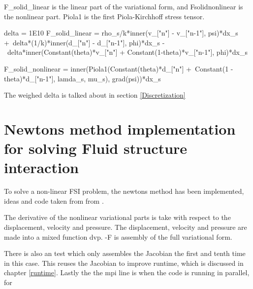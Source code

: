 F\_solid\_linear is the linear part of the variational form, and Fsolidnonlinear is the nonlinear part.
Piola1 is the first Piola-Kirchhoff stress tensor.
\begin{python}
delta = 1E10
F_solid_linear = rho_s/k*inner(v_["n"] - v_["n-1"], psi)*dx_s +\
delta*(1/k)*inner(d_["n"] - d_["n-1"], phi)*dx_s -\
delta*inner(Constant(theta)*v_["n"] + Constant(1-theta)*v_["n-1"], phi)*dx_s

F_solid_nonlinear = inner(Piola1(Constant(theta)*d_["n"] +\
Constant(1 - theta)*d_["n-1"], lamda_s, mu_s), grad(psi))*dx_s
\end{python}

The weighed delta is talked about in section \ref{Discretization}

\section{Newtons method implementation for solving Fluid structure interaction}
To solve a non-linear FSI problem, the newtons method has been implemented, ideas and code taken from from \cite{White2006}.

The derivative of the nonlinear variational parts is take with respect to the displacement, velocity and pressure. The displacement, velocity and pressure are made into a mixed function dvp. -F is assembly of the full variational form.

There is also an  test which only assembles the Jacobian the first and tenth time in this case. This reuses the Jacobian to improve runtime, which is discussed in chapter \ref{runtime}. Lastly the the mpi line is when the code is running in parallel, for 


